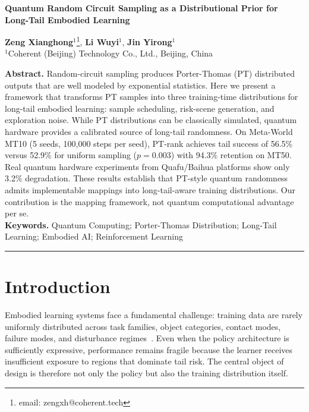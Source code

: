 \documentclass[twocolumn, a4paper, 11pt]{article}
\begin{document}
\twocolumngrid

\begin{center}
\textbf{\LARGE Quantum Random Circuit Sampling as a Distributional Prior for Long-Tail Embodied Learning}\\[0.2in]
\end{center}
\begin{small}
\textbf{Zeng Xianghong}$^{1}$\footnote{email: zengxh@coherent.tech},
\textbf{Li Wuyi}$^{1}$,
\textbf{Jin Yirong}$^{1}$\\[4pt]
{\small $^{1}$Coherent (Beijing) Technology Co., Ltd., Beijing, China}
\end{small}
\bigskip

\noindent\textbf{Abstract.}
Random-circuit sampling produces Porter-Thomas (PT) distributed outputs that are well modeled by exponential statistics. Here we present a framework that transforms PT samples into three training-time distributions for long-tail embodied learning: sample scheduling, risk-scene generation, and exploration noise. While PT distributions can be classically simulated, quantum hardware provides a calibrated source of long-tail randomness. On Meta-World MT10 (5 seeds, 100,000 steps per seed), PT-rank achieves tail success of 56.5\% versus 52.9\% for uniform sampling ($p=0.003$) with 94.3\% retention on MT50. Real quantum hardware experiments from Quafu/Baihua platforms show only 3.2\% degradation. These results establish that PT-style quantum randomness admits implementable mappings into long-tail-aware training distributions. Our contribution is the mapping framework, not quantum computational advantage per se.\\[2mm]
\textbf{Keywords.}
Quantum Computing; Porter-Thomas Distribution; Long-Tail Learning; Embodied AI; Reinforcement Learning

\medskip\hrule\medskip

\twocolumn

\section{Introduction}

Embodied learning systems face a fundamental challenge: training data are rarely uniformly distributed across task families, object categories, contact modes, failure modes, and disturbance regimes~\cite{yu2019metaworld}. Even when the policy architecture is sufficiently expressive, performance remains fragile because the learner receives insufficient exposure to regions that dominate tail risk. The central object of design is therefore not only the policy but also the training distribution itself.
\end{document}
